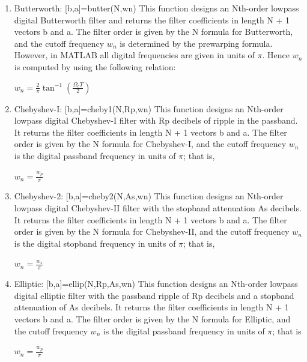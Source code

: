 \documentclass{article}
\begin{document}
\begin{enumerate}
    \item Butterworth: [b,a]=butter(N,wn) 
    This function designs an Nth-order lowpass digital Butterworth filter and returns the filter coefficients in length N + 1 vectors b and a. The filter order is given by the N formula for Butterworth, and the cutoff frequency $w_n$ is determined by the prewarping formula. However, in MATLAB all digital frequencies are given in units of $\pi$. Hence $w_n$ is computed by using the following relation:
    \begin{center}
        $w_n=\frac{2}{\pi}\tan^{-1}(\frac{\Omega_cT}{2})$
    \end{center}
    \item Chebyshev-I: [b,a]=cheby1(N,Rp,wn)
    This function designs an Nth-order lowpass digital Chebyshev-I filter
    with Rp decibels of ripple in the passband. It returns the filter coefficients in length N + 1 vectors b and a. The filter order is given by the N formula for Chebyshev-I, and the cutoff frequency $w_n$ is the digital passband frequency
    in units of $\pi$; that is,
    \begin{center}
        $w_n=\frac{w_p}{\pi}$
    \end{center}
    \item Chebyshev-2: [b,a]=cheby2(N,As,wn)
    This function designs an Nth-order lowpass digital Chebyshev-II filter with the stopband attenuation As decibels. It returns the filter coefficients in length N + 1 vectors b and a. The filter order is given by the N formula for Chebyshev-II, and the cutoff frequency $w_n$ is the digital stopband frequency in units of $\pi$; that is,
    \begin{center}
        $w_n=\frac{w_s}{\pi}$
    \end{center}
    \item Elliptic: [b,a]=ellip(N,Rp,As,wn)
    This function designs an Nth-order lowpass digital elliptic filter with the passband ripple of Rp decibels and a stopband attenuation of As decibels. It returns the filter coefficients in length N + 1 vectors b and a. The filter order is given by the N formula for Elliptic, and the cutoff frequency $w_n$ is the digital passband frequency in units of $\pi$; that is
\begin{center}
    $w_n=\frac{w_p}{\pi}$
\end{center}

\end{enumerate}
\end{document}
